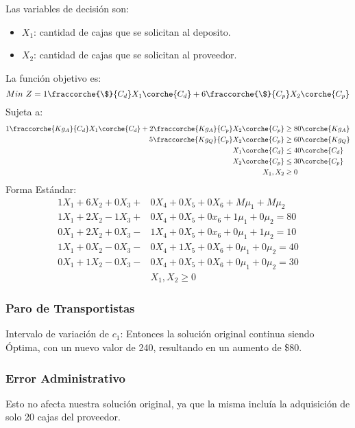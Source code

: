 
\begin{homeworkProblem}
Las variables de decisión son:
\begin{itemize}
	\item $X_1$: cantidad de cajas que se solicitan al deposito.
	\item $X_2$: cantidad de cajas  que se solicitan al proveedor. 
\end{itemize}
La función objetivo es: 
\begin{equation}
	Min\ Z = 1\fraccorche{\$}{C_d}X_1\corche{C_d} + 6\fraccorche{\$}{C_p}X_2\corche{C_p}
\end{equation}
Sujeta a:
\begin{align*}
	1\fraccorche{Kg_A}{C_d}X_1\corche{C_d} + 2\fraccorche{Kg_A}{C_p}X_2\corche{C_p} &\ge 80 \corche{Kg_A}\\
	5\fraccorche{Kg_Q}{C_p}X_2\corche{C_p} &\ge 60 \corche{Kg_Q} \\
	X_1\corche{C_d} &\le 40\corche{C_d} \\
	X_2\corche{C_p} &\le 30 \corche{C_p} \\
	X_1,X_2 &\ge 0
\end{align*}
Forma Estándar:
\begin{align*}
	1X_1 + 6X_2 + 0X_3 + &0X_4 + 0X_5 + 0X_6 + M\mu_1 + M\mu_2 \\
	1X_1 + 2X_2 - 1X_3 +&0X_4 +0X_5 + 0x_6 + 1\mu_1 + 0\mu_2 = 80 \\
	0X_1 + 2X_2 + 0X_3 -&1X_4 +0X_5 + 0x_6 + 0\mu_1 + 1\mu_2 = 10 \\
	1X_1 + 0X_2 - 0X_3 -&0X_4 + 1X_5 + 0X_6 + 0\mu_1 + 0\mu_2 = 40 \\
	0X_1 + 1X_2 - 0X_3 -&0X_4 + 0X_5 + 0X_6 + 0\mu_1 + 0\mu_2 = 30 \\
	&X_1,X_2 \ge 0
\end{align*}
\subsubsection{Paro de Transportistas}
Intervalo de variación de $c_1$:
Entonces la solución original continua siendo Óptima, con un nuevo valor de 240, resultando en un aumento de \$80.
\subsubsection{Error Administrativo}
Esto no afecta nuestra solución original, ya que la misma incluía la adquisición de solo 20 cajas del proveedor.

\end{homeworkProblem}
